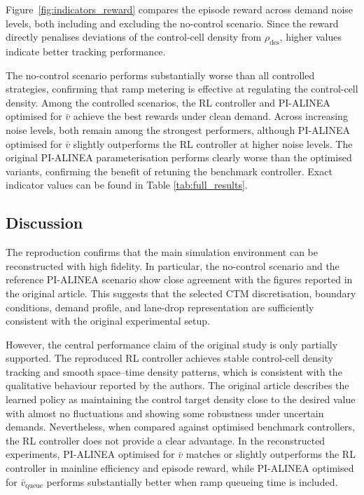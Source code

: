 Figure~\ref{fig:indicators_reward} compares the episode reward across demand
noise levels, both including and excluding the no-control scenario. Since the
reward directly penalises deviations of the control-cell density from
\(\rho_{\mathrm{des}}\), higher values indicate better tracking performance.

The no-control scenario performs substantially worse than all controlled
strategies, confirming that ramp metering is effective at regulating the
control-cell density. Among the controlled scenarios, the RL controller and
PI-ALINEA optimised for \(\bar{v}\) achieve the best rewards under clean demand.
Across increasing noise levels, both remain among the strongest performers,
although PI-ALINEA optimised for \(\bar{v}\) slightly outperforms the RL
controller at higher noise levels. The original PI-ALINEA parameterisation
performs clearly worse than the optimised variants, confirming the benefit of
retuning the benchmark controller. Exact indicator values can be found in Table \ref{tab:full_results}.




\clearpage

\subsection{Discussion}

The reproduction confirms that the main simulation environment can be
reconstructed with high fidelity. In particular, the no-control scenario and the
reference PI-ALINEA scenario show close agreement with the figures reported in
the original article. This suggests that the selected CTM discretisation,
boundary conditions, demand profile, and lane-drop representation are sufficiently
consistent with the original experimental setup.

However, the central performance claim of the original study is only partially
supported. The reproduced RL controller achieves stable control-cell density
tracking and smooth space--time density patterns, which is consistent with the
qualitative behaviour reported by the authors. The original article describes the
learned policy as maintaining the control target density close to the desired
value with almost no fluctuations and showing some robustness under uncertain
demands. Nevertheless, when compared against optimised benchmark controllers,
the RL controller does not provide a clear advantage. In the reconstructed
experiments, PI-ALINEA optimised for \(\bar{v}\) matches or slightly outperforms
the RL controller in mainline efficiency and episode reward, while PI-ALINEA
optimised for \(\bar{v}_{\mathrm{queue}}\) performs substantially better when
ramp queueing time is included.

